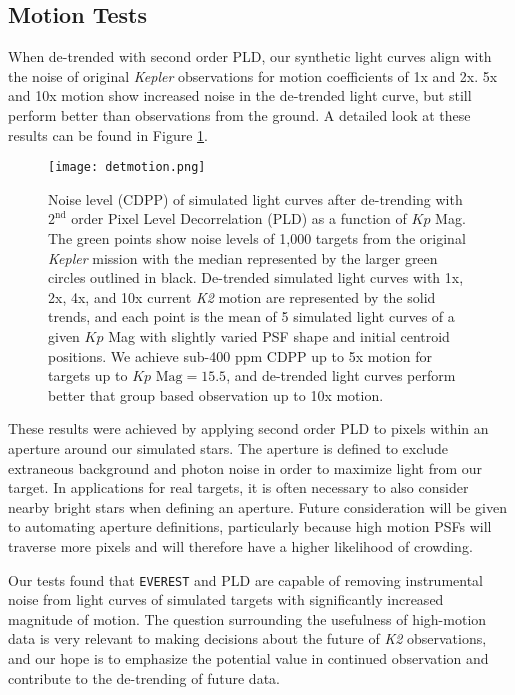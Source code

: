 \documentclass[12pt,preprint]{aastex}
\begin{document}
\subsection{Motion Tests}

When de-trended with second order PLD, our synthetic light curves align with the noise of original \textit{Kepler} observations for motion coefficients of 1x and 2x. 5x and 10x motion show increased noise in the de-trended light curve, but still perform better than observations from the ground. A detailed look at these results can be found in Figure \ref{fig:detmotion}.

\begin{figure}[h]
	\centering
	\texttt{[image: detmotion.png]}
	\caption{Noise level (CDPP) of simulated light curves after de-trending with $2^{\text{nd}}$ order Pixel Level Decorrelation (PLD) as a function of $Kp$ Mag. The green points show noise levels of 1,000 targets from the original \textit{Kepler} mission with the median represented by the larger green circles outlined in black. De-trended simulated light curves with 1x, 2x, 4x, and 10x current \textit{K2} motion are represented by the solid trends, and each point is the mean of 5 simulated light curves of a given $Kp$ Mag with slightly varied PSF shape and initial centroid positions. We achieve sub-400 ppm CDPP up to 5x motion for targets up to $Kp \text{ Mag}=15.5$, and de-trended light curves perform better that group based observation up to 10x motion.}
	\label{fig:detmotion}
\end{figure}

These results were achieved by applying second order PLD to pixels within an aperture around our simulated stars. The aperture is defined to exclude extraneous background and photon noise in order to maximize light from our target. In applications for real targets, it is often necessary to also consider nearby bright stars when defining an aperture. Future consideration will be given to automating aperture definitions, particularly because high motion PSFs will traverse more pixels and will therefore have a higher likelihood of crowding.

Our tests found that \texttt{EVEREST} and PLD are capable of removing instrumental noise from light curves of simulated targets with significantly increased magnitude of motion. The question surrounding the usefulness of high-motion data is very relevant to making decisions about the future of \textit{K2} observations, and our hope is to emphasize the potential value in continued observation and contribute to the de-trending of future data.
\end{document}
